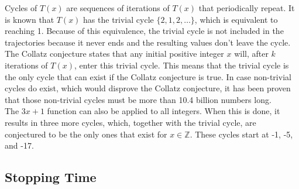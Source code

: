 \documentclass[12pt,a4paper,reqno]{amsart}
\begin{document}
Cycles of $T(x)$ are sequences of iterations of $T(x)$ that periodically 
repeat. It is known that $T(x)$ has the trivial cycle $\{2,1,2,\dots\}$, which 
is equivalent to reaching 1. Because of this equivalence, the trivial cycle is
not included in the trajectories because it never ends and the resulting values
don't leave the cycle. The Collatz conjecture states that any initial positive 
integer $x$ will, after $k$ iterations of $T(x)$, enter this trivial cycle. 
This means that the trivial cycle is the only cycle that can exist if the
Collatz conjecture is true.
In case non-trivial cycles do exist, which would disprove the Collatz
conjecture, it has been proven that those non-trivial cycles must be more than 
10.4 billion numbers long. \\
The $3x+1$ function can also be applied to all integers. When this is done, it
results in three more cycles, which, together with the trivial cycle, are 
conjectured to be the only ones that exist for $x \in \mathbb{Z}$. These 
cycles start at -1, -5, and -17.

\subsection{Stopping Time}
\end{document}

